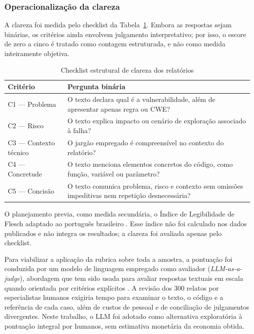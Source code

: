 \subsubsection{Operacionalização da clareza}\label{subsubsec:operacionalizacao-clareza}

A clareza foi medida pelo checklist da Tabela~\ref{tab:checklist-clareza}. Embora as respostas sejam binárias, os critérios ainda envolvem julgamento interpretativo; por isso, o escore de zero a cinco é tratado como contagem estruturada, e não como medida inteiramente objetiva.

\begin{table}[htb]
\ABNTEXfontereduzida
\caption{\label{tab:checklist-clareza}Checklist estrutural de clareza dos relatórios}
\centering
\begin{tabularx}{\textwidth}{|l|X|}
\hline
\textbf{Critério} & \textbf{Pergunta binária} \\
\hline
C1 --- Problema & O texto declara qual é a vulnerabilidade, além de apresentar apenas regra ou CWE? \\
\hline
C2 --- Risco & O texto explica impacto ou cenário de exploração associado à falha? \\
\hline
C3 --- Contexto técnico & O jargão empregado é compreensível no contexto do relatório? \\
\hline
C4 --- Concretude & O texto menciona elementos concretos do código, como função, variável ou parâmetro? \\
\hline
C5 --- Concisão & O texto comunica problema, risco e contexto sem omissões impeditivas nem repetição desnecessária? \\
\hline
\end{tabularx}
\end{table}

O planejamento previa, como medida secundária, o Índice de Legibilidade de Flesch adaptado ao português brasileiro \cite{Martins1996ReadabilityPortuguese}. Esse índice não foi calculado nos dados publicados e não integra os resultados; a clareza foi avaliada apenas pelo checklist.

Para viabilizar a aplicação da rubrica sobre toda a amostra, a pontuação foi conduzida por um modelo de linguagem empregado como avaliador (\textit{LLM-as-a-judge}), abordagem que tem sido usada para avaliar respostas textuais em escala quando orientada por critérios explícitos \cite{Zheng2023LLMJudge}. A revisão dos 300 relatos por especialistas humanos exigiria tempo para examinar o texto, o código e a referência de cada caso, além de custos de pessoal e de conciliação de julgamentos divergentes. Neste trabalho, o LLM foi adotado como alternativa exploratória à pontuação integral por humanos, sem estimativa monetária da economia obtida.

